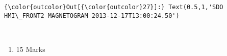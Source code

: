 \documentclass[11pt]{article}
\providecommand{\tightlist}{%
      \setlength{\itemsep}{0pt}\setlength{\parskip}{0pt}}
\begin{document}
\begin{Verbatim}[commandchars=\\\{\}]
{\color{outcolor}Out[{\color{outcolor}27}]:} Text(0.5,1,'SDO HMI\_FRONT2 MAGNETOGRAM 2013-12-17T13:00:24.50')
\end{Verbatim}
            
    \begin{center}
    \end{center}
    { \hspace*{\fill} \\}
    
    \begin{enumerate}
\def\labelenumi{\alph{enumi})}
\setcounter{enumi}{1}
\tightlist
\item
  15 Marks
\end{enumerate}
\end{document}
